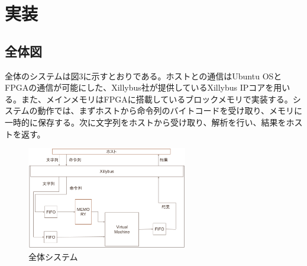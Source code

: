 \documentclass[submit,techrep]{ipsj}
\begin{document}


\section{実装}

\subsection{全体図}

全体のシステムは図3に示すとおりである。ホストとの通信はUbuntu OSとFPGAの通信が可能にした、Xillybus社が提供しているXillybus IPコアを用いる。また、メインメモリはFPGAに搭載しているブロックメモリで実装する。システムの動作では、まずホストから命令列のバイトコードを受け取り、メモリに一時的に保存する。次に文字列をホストから受け取り、解析を行い、結果をホストを返す。

\begin{figure}[h]
    \begin{center}
        \includegraphics[width=70mm]{./fig/system}
      \caption{全体システム}
    \end{center}
\end{figure}
\end{document}
